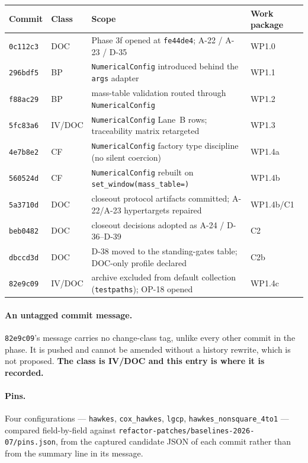 \documentclass[
  10pt,
]{article}
\begin{document}
\begin{longtable}[]{@{}
  >{\raggedright\arraybackslash}p{}
  >{\raggedright\arraybackslash}p{}
  >{\raggedright\arraybackslash}p{}
  >{\raggedright\arraybackslash}p{}@{}}
\toprule\noalign{}
Commit & Class & Scope & Work package \\
\midrule\noalign{}
\endhead
\bottomrule\noalign{}
\endlastfoot
\texttt{0c112c3} & DOC & Phase 3f opened at \texttt{fe44de4}; A-22 / A-23 / D-35 & WP1.0 \\
\texttt{296bdf5} & BP & \texttt{NumericalConfig} introduced behind the \texttt{args} adapter & WP1.1 \\
\texttt{f88ac29} & BP & mass-table validation routed through \texttt{NumericalConfig} & WP1.2 \\
\texttt{5fc83a6} & IV/DOC & \texttt{NumericalConfig} Lane~B rows; traceability matrix retargeted & WP1.3 \\
\texttt{4e7b8e2} & CF & \texttt{NumericalConfig} factory type discipline (no silent coercion) & WP1.4a \\
\texttt{560524d} & CF & \texttt{NumericalConfig} rebuilt on \texttt{set\_window(mass\_table=)} & WP1.4b \\
\texttt{5a3710d} & DOC & closeout protocol artifacts committed; A-22/A-23 hypertargets repaired & WP1.4b/C1 \\
\texttt{beb0482} & DOC & closeout decisions adopted as A-24 / D-36--D-39 & C2 \\
\texttt{dbccd3d} & DOC & D-38 moved to the standing-gates table; DOC-only profile declared & C2b \\
\texttt{82e9c09} & IV/DOC & archive excluded from default collection (\texttt{testpaths}); OP-18 opened & WP1.4c \\
\end{longtable}

\paragraph{An untagged commit message.}
\texttt{82e9c09}'s message carries no change-class tag, unlike every other commit in the phase. It is pushed and cannot be amended without a history rewrite, which is not proposed. \textbf{The class is IV/DOC and this entry is where it is recorded.}

\paragraph{Pins.}
Four configurations --- \texttt{hawkes}, \texttt{cox\_hawkes}, \texttt{lgcp}, \texttt{hawkes\_nonsquare\_4to1} --- compared field-by-field against \texttt{refactor-patches/baselines-2026-07/pins.json}, from the captured candidate JSON of each commit rather than from the summary line in its message.
\end{document}
